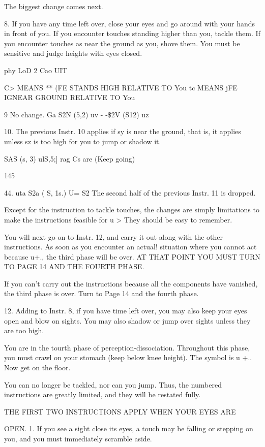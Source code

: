 \documentclass[10pt,twoside]{memoir}
\begin{document}
\begin{enumerate}
{\begin{enumerate}
\begin{sysrules}
\begin{sysrules}
\begin{sysrules}
\begin{sysrules}
{\begin{enumerate}
\begin{sysrules}
\begin{enumerate}
The biggest change comes next. 

8. If you have any time left over, close your eyes and go around with 
your hands in front of you. If you encounter touches standing higher than 
you, tackle them. If you encounter touches as near the ground as you, shove 
them. You must be sensitive and judge heights with eyes closed. 


phy LoD 
2 Cao UIT 


C> MEANS ** (FE STANDS HIGH RELATIVE TO You 
tc MEANS jFE IGNEAR GROUND RELATIVE TO You 


9 No change. 
Ga S2N (5,2) uv 
- -\$2V (S12) uz %


10. The previous Instr. 10 applies if sy is near the ground, that is, it 
applies unless sz is too high for you to jump or shadow it. 


SAS (s, 3) ulS,5;] 
rag Cs are 
(Keep going) 


145 


44. uta S2a ( S, 1s.) U= S2 
The second half of the previous Instr. 11 is dropped. 


Except for the instruction to tackle touches, the changes are simply 
limitations to make the instructions feasible for u > They should be easy 
to remember. 


You will next go on to Instr. 12, and carry it out along with the other 
instructions. As soon as you encounter an actual! situation where you cannot 
act because u+., the third phase will be over. AT THAT POINT YOU 
MUST TURN TO PAGE 14 AND THE FOURTH PHASE. 


If you can't carry out the instructions because all the components have 
vanished, the third phase is over. Turn to Page 14 and the fourth phase. 


12. Adding to Instr. 8, if you have time left over, you may also keep 
your eyes open and blow on sights. You may also shadow or jump over 
sights unless they are too high. 


You are in the tourth phase of perception-dissociation. Throughout this 
phase, you must crawl on your stomach (keep below knee height). The 
symbol is u +.. Now get on the floor. 

You can no longer be tackled, nor can you jump. Thus, the numbered 
instructions are greatly limited, and they will be restated fully. 

THE FIRST TWO INSTRUCTIONS APPLY WHEN YOUR EYES ARE 


OPEN. 
1. If you see a sight close its eyes, a touch may be falling or stepping 
on you, and you must immediately scramble aside. 



\end{enumerate}
\end{sysrules}
\end{enumerate}}
\end{sysrules}
\end{sysrules}
\end{sysrules}
\end{sysrules}
\end{enumerate}}
\end{enumerate}
\end{document}
